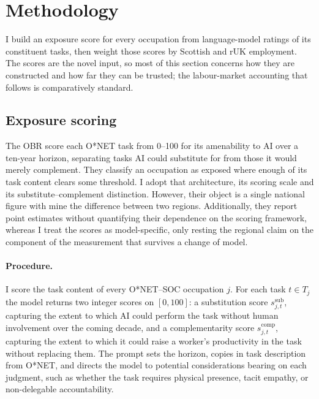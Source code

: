 \section{Methodology}\label{sec:method}


I build an exposure score for every occupation from language-model ratings of its constituent tasks, then weight those scores by Scottish and rUK employment. The scores are the novel input, so most of this section concerns how they are constructed and how far they can be trusted; the labour-market accounting that follows is comparatively standard.

\subsection{Exposure scoring}\label{sec:scoring}

The OBR score each O*NET task from 0--100 for its amenability to AI over a ten-year horizon, separating tasks AI could substitute for from those it would merely complement. They classify an occupation as exposed where enough of its task content clears some threshold. I adopt that architecture, its scoring scale and its substitute--complement distinction. However, their object is a single national figure with mine the difference between two regions. Additionally, they report point estimates without quantifying their dependence on the scoring framework, whereas I treat the scores as model-specific, only resting the regional claim on the component of the measurement that survives a change of model.

\paragraph{Procedure.} I score the task content of every O*NET--SOC occupation $j$. For each task $t \in T_j$ the model returns two integer scores on $[0,100]$: a substitution score $s^{\mathrm{sub}}_{j,t}$, capturing the extent to which AI could perform the task without human involvement over the coming decade, and a complementarity score $s^{\mathrm{comp}}_{j,t}$, capturing the extent to which it could raise a worker's productivity in the task without replacing them. The prompt sets the horizon, copies in task description from O*NET, and directs the model to potential considerations bearing on each judgment, such as whether the task requires physical presence, tacit empathy, or non-delegable accountability.

